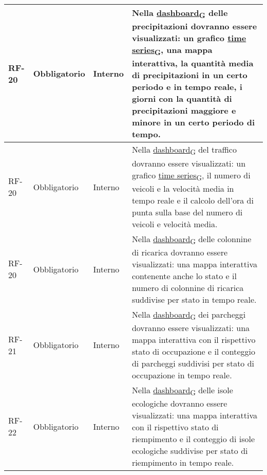 \begin{longtable}{|>{\centering\arraybackslash}m{}|>{\centering\arraybackslash}m{}|>{\centering\arraybackslash}m{}|>{\centering\arraybackslash}m{}|}
	RF-20           & Obbligatorio        & Interno        & Nella \href{https://7last.github.io/docs/rtb/documentazione-interna/glossario\#dashboard}{dashboard\textsubscript{G}} delle precipitazioni dovranno essere visualizzati: un grafico \href{https://7last.github.io/docs/rtb/documentazione-interna/glossario\#time-series}{time series\textsubscript{G}}, una mappa interattiva, la quantità media di precipitazioni in un certo periodo e in tempo reale, i giorni con la quantità di precipitazioni maggiore e minore in un certo periodo di tempo.                  \\\hline
	RF-20           & Obbligatorio        & Interno        & Nella \href{https://7last.github.io/docs/rtb/documentazione-interna/glossario\#dashboard}{dashboard\textsubscript{G}} del traffico dovranno essere visualizzati: un grafico \href{https://7last.github.io/docs/rtb/documentazione-interna/glossario\#time-series}{time series\textsubscript{G}}, il numero di veicoli e la velocità media in tempo reale e il calcolo dell'ora di punta sulla base del numero di veicoli e velocità media.                                                                            \\\hline
	RF-20           & Obbligatorio        & Interno        & Nella \href{https://7last.github.io/docs/rtb/documentazione-interna/glossario\#dashboard}{dashboard\textsubscript{G}} delle colonnine di ricarica dovranno essere visualizzati: una mappa interattiva contenente anche lo stato e il numero di colonnine di ricarica suddivise per stato in tempo reale.                                                                                                      \\\hline
	RF-21           & Obbligatorio        & Interno        & Nella \href{https://7last.github.io/docs/rtb/documentazione-interna/glossario\#dashboard}{dashboard\textsubscript{G}} dei parcheggi dovranno essere visualizzati: una mappa interattiva con il rispettivo stato di occupazione e il conteggio di parcheggi suddivisi per stato di occupazione in tempo reale.                                                                                                 \\\hline
	RF-22           & Obbligatorio        & Interno        & Nella \href{https://7last.github.io/docs/rtb/documentazione-interna/glossario\#dashboard}{dashboard\textsubscript{G}} delle isole ecologiche dovranno essere visualizzati: una mappa interattiva con il rispettivo stato di riempimento e il conteggio di isole ecologiche suddivise per stato di riempimento in tempo reale.                                                                                 \\\hline

\end{longtable}
